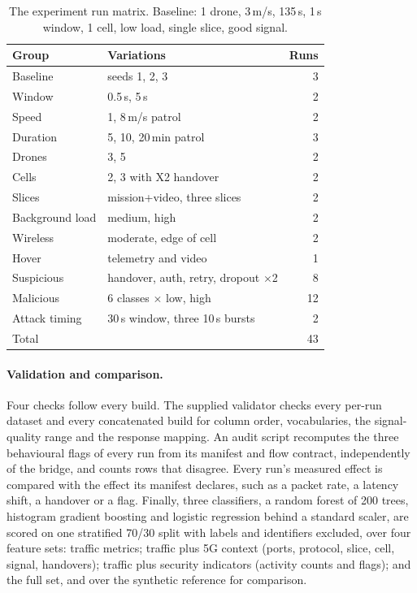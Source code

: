 \documentclass[10pt,twocolumn]{article}
\begin{document}
\begin{table}[H]
\centering\small
\caption{The experiment run matrix. Baseline: 1 drone, 3\,m/s, 135\,s, 1\,s window, 1 cell, low load, single slice, good signal.}
\label{tab:matrix}
\footnotesize
\begin{tabular}{@{}llr@{}}
\toprule
Group & Variations & Runs \\
\midrule
Baseline & seeds 1, 2, 3 & 3 \\
Window & 0.5\,s, 5\,s & 2 \\
Speed & 1, 8\,m/s patrol & 2 \\
Duration & 5, 10, 20\,min patrol & 3 \\
Drones & 3, 5 & 2 \\
Cells & 2, 3 with X2 handover & 2 \\
Slices & mission+video, three slices & 2 \\
Background load & medium, high & 2 \\
Wireless & moderate, edge of cell & 2 \\
Hover & telemetry and video & 1 \\
Suspicious & handover, auth, retry, dropout $\times$2 & 8 \\
Malicious & 6 classes $\times$ low, high & 12 \\
Attack timing & 30\,s window, three 10\,s bursts & 2 \\
\midrule
Total & & 43 \\
\bottomrule
\end{tabular}
\end{table}

\paragraph{Validation and comparison.} Four checks follow every build. The supplied validator
checks every per-run dataset and every concatenated build for column order,
vocabularies, the signal-quality range and the response mapping. An audit
script recomputes the three behavioural flags of every run from its manifest
and flow contract, independently of the bridge, and counts rows that
disagree. Every run's measured effect is compared with the effect its
manifest declares, such as a packet rate, a latency shift, a handover or a
flag. Finally, three classifiers, a random forest of 200 trees, histogram
gradient boosting and logistic regression behind a standard scaler, are
scored on one stratified 70/30 split with labels and identifiers excluded,
over four feature sets: traffic metrics; traffic plus 5G context (ports,
protocol, slice, cell, signal, handovers); traffic plus security indicators (activity
counts and flags); and the full set, and over the synthetic reference for
comparison.
\end{document}
